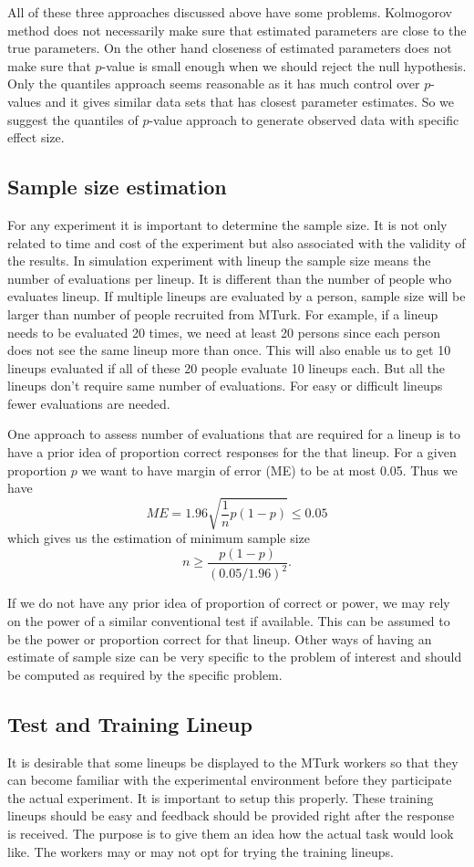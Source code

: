 \documentclass[11pt]{article}
\begin{document}
All of these three approaches discussed above have some problems. Kolmogorov method does not necessarily make sure that estimated parameters are close to the true parameters. On the other hand closeness of estimated parameters does not make sure that $p$-value is small enough when we should reject the null hypothesis. Only the quantiles approach seems reasonable as it has much control over $p$-values and it gives similar data sets that has closest parameter estimates. So we suggest the quantiles of $p$-value approach to generate observed data with specific effect size.

\subsection{Sample size estimation} For any experiment it is important to determine the sample size. It is not only related to time and cost of the experiment but also associated with the validity of the results. In simulation experiment with lineup the sample size means the number of evaluations per lineup. It is different than the number of people who evaluates lineup. If multiple lineups are evaluated by a person, sample size will be larger than number of people recruited from MTurk. For example, if a lineup needs to be evaluated 20 times, we need at least 20 persons since each person does not see the same lineup more than once. This will also enable us to get 10 lineups evaluated if all of these 20 people evaluate 10 lineups each. But all the lineups don't require same number of evaluations. For easy or difficult lineups fewer evaluations are needed.

One approach to assess number of evaluations that are required for a lineup is to have a prior idea of proportion correct responses for the that lineup. For a given proportion $p$ we want to have margin of error (ME) to be at most 0.05. Thus we have $$ME =1.96 \sqrt{ \frac 1 n p(1-p)} \le 0.05$$ which gives us the estimation of minimum sample size $$n \geq \frac{p(1-p)}{(0.05/1.96)^2}.$$ 

If we do not have any prior idea of proportion of correct or power, we may rely on the power of a similar conventional test if available. This can be assumed to be the power or proportion correct for that lineup. Other ways of having an estimate of sample size can be very specific to the problem of interest and should be computed as required by the specific problem.

\subsection{Test and Training Lineup} It is desirable that some lineups be displayed to the MTurk workers so that they can become familiar with the experimental environment before they participate the actual experiment. It is important to setup this properly. These training lineups should be easy and feedback should be provided right after the response is received. The purpose is to give them an idea how the actual task would look like. The workers may or may not opt for trying the training lineups.
\end{document}
